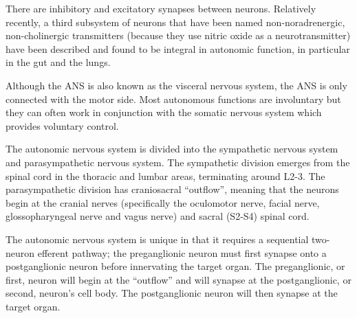 There are inhibitory and excitatory synapses between neurons. Relatively recently, a third subsystem of neurons that have been named non-noradrenergic, non-cholinergic transmitters (because they use nitric oxide as a neurotransmitter) have been described and found to be integral in autonomic function, in particular in the gut and the lungs.

Although the ANS is also known as the visceral nervous system, the ANS is only connected with the motor side. Most autonomous functions are involuntary but they can often work in conjunction with the somatic nervous system which provides voluntary control.

The autonomic nervous system is divided into the sympathetic nervous system and parasympathetic nervous system. The sympathetic division emerges from the spinal cord in the thoracic and lumbar areas, terminating around L2-3. The parasympathetic division has craniosacral ``outflow'', meaning that the neurons begin at the cranial nerves (specifically the oculomotor nerve, facial nerve, glossopharyngeal nerve and vagus nerve) and sacral (S2-S4) spinal cord.

The autonomic nervous system is unique in that it requires a sequential two-neuron efferent pathway; the preganglionic neuron must first synapse onto a postganglionic neuron before innervating the target organ. The preganglionic, or first, neuron will begin at the ``outflow'' and will synapse at the postganglionic, or second, neuron's cell body. The postganglionic neuron will then synapse at the target organ.

